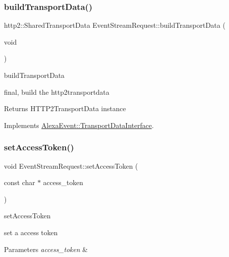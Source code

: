 \subsubsection{\texorpdfstring{build\+Transport\+Data()}{buildTransportData()}}
{\footnotesize\ttfamily http2\+::\+Shared\+Transport\+Data Event\+Stream\+Request\+::build\+Transport\+Data (\begin{DoxyParamCaption}\item[{void}]{ }\end{DoxyParamCaption})\hspace{0.3cm}{\ttfamily [virtual]}}



build\+Transport\+Data 

final, build the http2transportdata \begin{DoxyReturn}{Returns}
H\+T\+T\+P2\+Transport\+Data instance 
\end{DoxyReturn}


Implements \hyperlink{classAlexaEvent_1_1TransportDataInterface}{Alexa\+Event\+::\+Transport\+Data\+Interface}.

\mbox{\label{classAlexaEvent_1_1EventStreamRequest_aa2dba1096313c98d24709adb2c03dcf0}} 
\subsubsection{\texorpdfstring{set\+Access\+Token()}{setAccessToken()}}
{\footnotesize\ttfamily void Event\+Stream\+Request\+::set\+Access\+Token (\begin{DoxyParamCaption}\item[{const char $\ast$}]{access\+\_\+token }\end{DoxyParamCaption})}



set\+Access\+Token 

set a access token 
\begin{DoxyParams}{Parameters}
{\em access\+\_\+token} & \\
\hline
\end{DoxyParams}
\mbox{\label{classAlexaEvent_1_1EventStreamRequest_a2daacbd57363d40dae81c8be99b50346}} 
